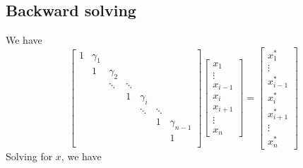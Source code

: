 \documentclass[landscape]{article}
\begin{document}

\subsection{Backward solving}
We have
\[
\left[\begin{array}{ccccccccc}
1     & \gamma_{1}  &           &           &              &           &             \\
      & 1           & \gamma_{2}            &              &           &             \\
      &             & \ddots    & \ddots    &              &           &             \\
      &             &           & 1         & \gamma_{i}   &           &             \\
      &             &           &           & \ddots       & \ddots    &             \\
      &             &           &           &              & 1         & \gamma_{n-1}\\
      &             &           &           &              &           & 1           \\
\end{array} \right]
\left[ \begin{array}{c}
x_{1} \\ \vdots \\ x_{i-1} \\ x_{i} \\ x_{i+1} \\ \vdots \\ x_{n}
\end{array} \right]
=
\left[ \begin{array}{c}
x^*_{1} \\ \vdots \\ x^*_{i-1} \\ x^*_{i} \\ x^*_{i+1} \\ \vdots \\ x^*_{n}
\end{array} \right]
\]
Solving for $x$, we have
\end{document}
